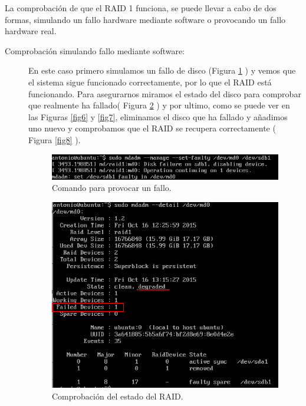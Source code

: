 La comprobación de que el RAID 1 funciona, se puede llevar a cabo de dos formas, simulando un fallo hardware mediante software o provocando un fallo hardware real.

\begin{description}
    \item[Comprobación simulando fallo mediante software:\cite{pruebaraid}]

 En este caso primero simulamos un fallo de disco (Figura \ref{fig4} ) y vemos que el sistema  sigue funcionado correctamente, por lo que el RAID  está funcionando. Para asegurarnos miramos el estado del disco para comprobar que realmente ha fallado( Figura \ref{fig5} ) y por ultimo, como se puede ver en las Figuras \ref{fig6} y \ref{fig7}, eliminamos el disco que ha fallado y añadimos uno nuevo y comprobamos que el RAID se recupera correctamente ( Figura \ref{fig8} ).

                \begin{figure}[H]
                    \begin{center}
                        \includegraphics[scale=0.6]{Imagenes/fallo}
                        \caption{Comando para provocar un fallo.}
                        \label{fig4}
                    \end{center}
                \end{figure}

            \begin{figure}[H]
                \begin{center}
                    \includegraphics[scale=0.5]{Imagenes/estado_fallo}
                    \caption{Comprobación del estado del RAID.}
                    \label{fig5}
                \end{center}
            \end{figure}


\end{description}
